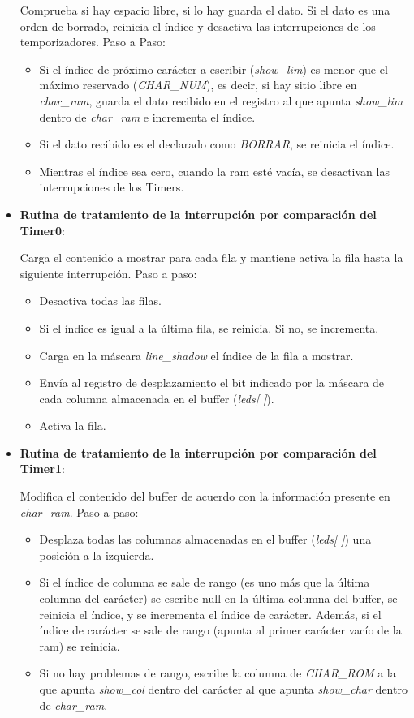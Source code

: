 \begin{itemize}
{  Comprueba si hay espacio libre, si lo hay guarda el dato. Si el dato es una orden de borrado, reinicia el índice y desactiva las interrupciones de los temporizadores. Paso a Paso:
  \begin{itemize}
     \item{Si el índice de próximo carácter a escribir (\textit{show\_lim}) es menor que el máximo reservado (\textit{CHAR\_NUM}), es decir, si hay sitio libre en \textit{char\_ram}, guarda el dato recibido en el registro al que apunta \textit{show\_lim} dentro de \textit{char\_ram} e incrementa el índice.}
     \item{Si el dato recibido es el declarado como \textit{BORRAR}, se reinicia el índice.}
     \item{Mientras el índice sea cero, cuando la ram esté vacía, se desactivan las interrupciones de los Timers.}
  \end{itemize}
}

\item{\textbf{Rutina de tratamiento de la interrupción por comparación del Timer0}:
  

  Carga el contenido a mostrar para cada fila y mantiene activa la fila hasta la siguiente interrupción. Paso a paso:
  \begin{itemize}
    \item{Desactiva todas las filas.}
    \item{Si el índice es igual a la última fila, se reinicia. Si no, se incrementa.}
    \item{Carga en la máscara \textit{line\_shadow} el índice de la fila a mostrar.}
    \item{Envía al registro de desplazamiento el bit indicado por la máscara de cada columna almacenada en el buffer (\textit{leds[ ]}).}
    \item{Activa la fila.}
  \end{itemize}
}

\item{\textbf{Rutina de tratamiento de la interrupción por comparación del Timer1}:
  

  Modifica el contenido del buffer de acuerdo con la información presente en \textit{char\_ram}. Paso a paso:
  \begin{itemize}
    \item{Desplaza todas las columnas almacenadas en el buffer (\textit{leds[ ]}) una posición a la izquierda.}
    \item{Si el índice de columna se sale de rango (es uno más que la última columna del carácter) se escribe null en la última columna del buffer, se reinicia el índice, y se incrementa el índice de carácter. Además, si el índice de carácter se sale de rango (apunta al primer carácter vacío de la ram) se reinicia.}
    \item{Si no hay problemas de rango, escribe la columna de \textit{CHAR\_ROM} a la que apunta \textit{show\_col} dentro del carácter al que apunta \textit{show\_char} dentro de \textit{char\_ram}.}
  \end{itemize}
}


\end{itemize}
